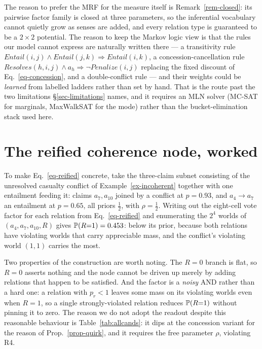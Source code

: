 The reason to prefer the MRF for the measure itself is Remark~\ref{rem-closed}: its pairwise factor
family is closed at three parameters, so the inferential vocabulary cannot quietly grow as senses are
added, and every relation type is guaranteed to be a $2\times2$ potential. The reason to keep the
Markov logic view is that the rules our model cannot express are naturally written there --- a
transitivity rule $\mathit{Entail}(i,j)\wedge\mathit{Entail}(j,k)\Rightarrow\mathit{Entail}(i,k)$, a
concession-cancellation rule $\mathit{Resolves}(h,i,j)\wedge a_h \Rightarrow \neg\mathit{Penalize}(i,j)$
replacing the fixed discount of Eq.~\ref{eq-concession}, and a double-conflict rule --- and their
weights could be \emph{learned} from labelled ladders rather than set by hand. That is the route past
the two limitations \S\ref{sec-limitations} names, and it requires an MLN solver (MC-SAT for marginals,
MaxWalkSAT for the mode) rather than the bucket-elimination stack used here.


\section{The reified coherence node, worked}
\label{app-reified}

To make Eq.~\ref{eq-reified} concrete, take the three-claim subnet consisting of the unresolved
casualty conflict of Example~\ref{ex-incoherent} together with one entailment feeding it: claims
$a_7,a_{10}$ joined by a conflict at $p=0.93$, and $a_4\to a_7$ an entailment at $p=0.65$, all priors
$\tfrac12$, with $\rho=\tfrac12$. Writing out the eight-cell vote factor for each relation from
Eq.~\ref{eq-reified} and enumerating the $2^4$ worlds of $(a_4,a_7,a_{10},R)$ gives
$\mathbb{P}\!\left( R{=}1 \right)=0.453$: below its prior, because both relations have violating worlds that carry
appreciable mass, and the conflict's violating world $(1,1)$ carries the most.

Two properties of the construction are worth noting. The $R=0$ branch is flat, so $R=0$ asserts nothing
and the node cannot be driven up merely by adding relations that happen to be satisfied. And the factor
is a \emph{noisy} AND rather than a hard one: a relation with $p_r<1$ leaves some mass on its violating
worlds even when $R=1$, so a single strongly-violated relation reduces $\mathbb{P}\!\left( R{=}1 \right)$ without pinning it
to zero. The reason we do not adopt the readout despite this reasonable behaviour is
Table~\ref{tab:allcands}: it dips at the concession variant for the reason of
Prop.~\ref{prop-quirk}, and it requires the free parameter $\rho$, violating R4.


